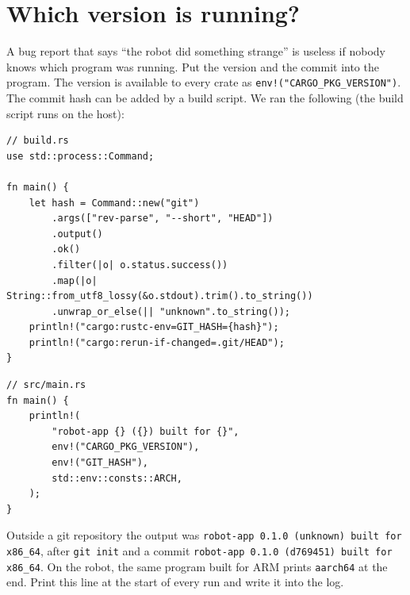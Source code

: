\section*{Which version is running?}
A bug report that says ``the robot did something strange'' is useless if nobody knows which program was running. Put the version and the commit into the program. The version is available to every crate as \verb|env!("CARGO_PKG_VERSION")|. The commit hash can be added by a build script. We ran the following (the build script runs on the host):
\begin{verbatim}
// build.rs
use std::process::Command;

fn main() {
    let hash = Command::new("git")
        .args(["rev-parse", "--short", "HEAD"])
        .output()
        .ok()
        .filter(|o| o.status.success())
        .map(|o| String::from_utf8_lossy(&o.stdout).trim().to_string())
        .unwrap_or_else(|| "unknown".to_string());
    println!("cargo:rustc-env=GIT_HASH={hash}");
    println!("cargo:rerun-if-changed=.git/HEAD");
}
\end{verbatim}
\begin{verbatim}
// src/main.rs
fn main() {
    println!(
        "robot-app {} ({}) built for {}",
        env!("CARGO_PKG_VERSION"),
        env!("GIT_HASH"),
        std::env::consts::ARCH,
    );
}
\end{verbatim}
Outside a git repository the output was \verb!robot-app 0.1.0 (unknown) built for x86_64!, after \verb!git init! and a commit \verb!robot-app 0.1.0 (d769451) built for x86_64!. On the robot, the same program built for ARM prints \verb!aarch64! at the end. Print this line at the start of every run and write it into the log.

